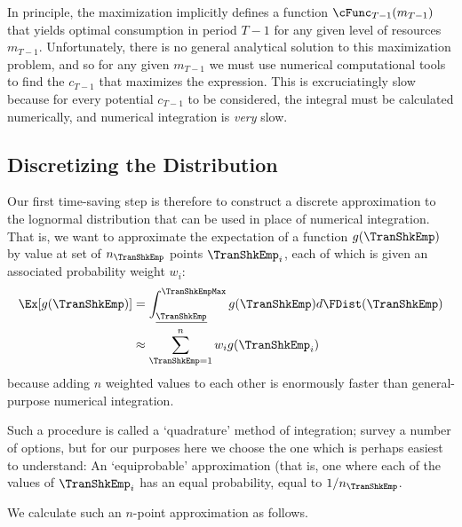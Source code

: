 \documentclass[titlepage, headings=optiontotocandhead]{\econtex}
\begin{document}
In principle, the maximization implicitly defines a function $\cFunc_{T-1}({m}_{T-1})$ that yields optimal consumption in period $T-1$ for any given level of resources ${m}_{T-1}$.  Unfortunately, there is no general analytical solution to this maximization problem, and so for any given ${m}_{T-1}$ we must use numerical computational tools to find the ${c}_{T-1}$ that maximizes the expression.  This is excruciatingly slow because for every potential ${c}_{T-1}$ to be considered, the integral must be calculated numerically, and numerical integration is \textit{very} slow.

\hypertarget{Discretizing-the-Distribution}{}
\subsection{Discretizing the Distribution}
Our first time-saving step is therefore to construct a discrete approximation to the lognormal distribution that can be used in place of numerical integration.  That is, we want to approximate the expectation of a function $g(\TranShkEmp)$ by value at set of $n_{\TranShkEmp}$ points $\TranShkEmp_{i}$, each of which is given an associated probability weight $w_{i}$:
\begin{equation*}\begin{gathered}\begin{aligned}
      \Ex[g(\TranShkEmp)] & = \int_{\TranShkEmpMin}^{\TranShkEmpMax}g(\TranShkEmp)d\FDist(\TranShkEmp) \\
      & \approx \sum_{\TranShkEmp = 1}^{n}w_{i}g(\TranShkEmp_{i})
    \end{aligned}\end{gathered}\end{equation*}
because adding $n$ weighted values to each other is enormously faster than general-purpose numerical integration.

Such a procedure is called a `quadrature' method of integration; \cite{Tanaka2013-bc} survey a number of options, but for our purposes here we choose the one which is perhaps easiest to understand: An `equiprobable' approximation (that is, one where each of the values of $\TranShkEmp_{i}$ has an equal probability, equal to $1/n_{\TranShkEmp}$.

We calculate such an $n$-point approximation as follows.
\end{document}
